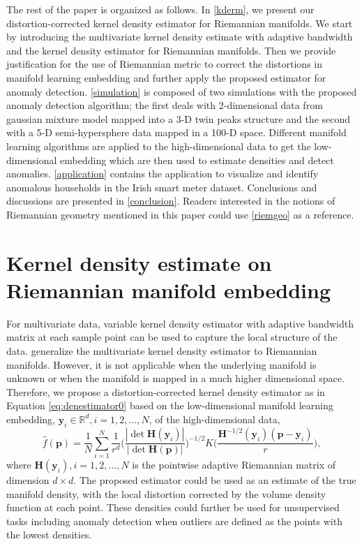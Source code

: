 \documentclass[11pt,a4paper,]{article}
\begin{document}
The rest of the paper is organized as follows. In \autoref{kderm}, we present our distortion-corrected kernel density estimator for Riemannian manifolds. We start by introducing the multivariate kernel density estimate with adaptive bandwidth and the kernel density estimator for Riemannian manifolds. Then we provide justification for the use of Riemannian metric to correct the distortions in manifold learning embedding and further apply the proposed estimator for anomaly detection. \autoref{simulation} is composed of two simulations with the proposed anomaly detection algorithm; the first deals with 2-dimensional data from gaussian mixture model mapped into a 3-D twin peaks structure and the second with a 5-D semi-hypersphere data mapped in a 100-D space. Different manifold learning algorithms are applied to the high-dimensional data to get the low-dimensional embedding which are then used to estimate densities and detect anomalies.
\autoref{application} contains the application to visualize and identify anomalous households in the Irish smart meter dataset. Conclusions and discussions are presented in \autoref{conclusion}. Readers interested in the notions of Riemannian geometry mentioned in this paper could use \autoref{riemgeo} as a reference.

\hypertarget{kderm}{%
\section{Kernel density estimate on Riemannian manifold embedding}\label{kderm}}

For multivariate data, variable kernel density estimator with adaptive bandwidth matrix at each sample point can be used to capture the local structure of the data. \textcite{Pelletier2005-vu} generalize the multivariate kernel density estimator to Riemannian manifolds. However, it is not applicable when the underlying manifold is unknown or when the manifold is mapped in a much higher dimensional space. Therefore, we propose a distortion-corrected kernel density estimator as in Equation \eqref{eq:denestimator0} based on the low-dimensional manifold learning embedding, \(\pmb{y}_i \in \mathbb{R}^d, i = 1, 2, \dots, N\), of the high-dimensional data,
\begin{equation}
\label{eq:denestimator0}
\hat{f}(\pmb{p}) = \frac{1}{N} \sum_{i=1}^{N} \frac{1}{r^d} \bigg(\frac{|\det \pmb{H}(\pmb{y}_i)|}{|\det \pmb{H}(\pmb{p})|} \bigg)^{-1/2} K\bigg( \frac{ \pmb{H}^{-1/2}(\pmb{y}_i) (\pmb{p} - \pmb{y}_i)}{r} \bigg),
\end{equation}
where \(\pmb{H}(\pmb{y}_i), i = 1, 2, \dots, N\) is the pointwise adaptive Riemannian matrix of dimension \(d \times d\).
The proposed estimator could be used as an estimate of the true manifold density, with the local distortion corrected by the volume density function at each point. These densities could further be used for unsupervised tasks including anomaly detection when outliers are defined as the points with the lowest densities.
\end{document}
